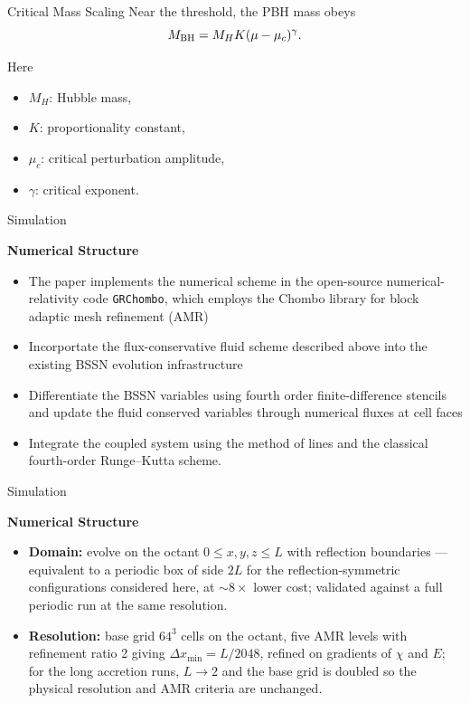 \documentclass[aspectratio=169, 12pt]{beamer}
\begin{document}
\begin{frame}{Critical Mass Scaling}
    Near the threshold, the PBH mass obeys
    \[
        M_{\rm BH}
        =
        M_H K(\mu-\mu_c)^\gamma.
    \]

    Here
    \begin{itemize}
        \item $M_H$: Hubble mass,
        \item $K$: proportionality constant,
        \item $\mu_c$: critical perturbation amplitude,
        \item $\gamma$: critical exponent.
    \end{itemize}
\end{frame}
\begin{frame}{Simulation}
	\begin{center}
		{\large\bfseries Numerical Structure\par}
	\end{center}
	\vspace{0.5em}
	\begin{itemize}
	    \item The paper implements the numerical scheme in the open-source numerical-relativity
			code \texttt{GRChombo}, which employs the Chombo library for block adaptic mesh refinement (AMR)
		\item Incorportate the flux-conservative fluid scheme described above into the existing BSSN evolution
			infrastructure
		\item Differentiate the BSSN variables using fourth order finite-difference stencils and update
			the fluid conserved variables through numerical fluxes at cell faces
		\item Integrate the coupled system using the method of
			lines and the classical fourth-order Runge–Kutta scheme.
	\end{itemize}
\end{frame}
\begin{frame}{Simulation}
	\begin{center}
		{\large\bfseries Numerical Structure\par}
	\end{center}
	\vspace{0.5em}
	\begin{itemize}
		\item \textbf{Domain:} evolve on the octant
			  $0 \le x, y, z \le L$ with reflection boundaries —
			  equivalent to a periodic box of side $2L$ for the
			  reflection-symmetric configurations considered here,
			  at $\sim\!8\times$ lower cost; validated against a full
			  periodic run at the same resolution.
		\item \textbf{Resolution:} base grid $64^3$ cells on the octant,
			  five AMR levels with refinement ratio 2 giving
			  $\Delta x_{\min} = L/2048$, refined on gradients of
			  $\chi$ and $E$; for the long accretion runs, $L \to 2$
			  and the base grid is doubled so the physical resolution
			  and AMR criteria are unchanged.
	\end{itemize}
\end{frame}
\end{document}
